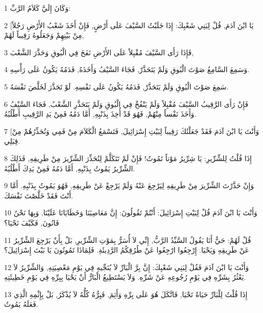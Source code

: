 \par 1 وَكَانَ إِلَيَّ كَلاَمُ الرَّبِّ:
\par 2 [يَا ابْنَ آدَمَ, قُلْ لِبَنِي شَعْبِكَ: إِذَا جَلَبْتُ السَّيْفَ عَلَى أَرْضٍ, فَإِنْ أَخَذَ شَعْبُ الأَرْضِ رَجُلاً مِنْ بَيْنِهِمْ وَجَعَلُوهُ رَقِيباً لَهُمْ,
\par 3 فَإِذَا رَأَى السَّيْفَ مُقْبِلاً عَلَى الأَرْضِ نَفَخَ فِي الْبُوقِ وَحَذَّرَ الشَّعْبَ,
\par 4 وَسَمِعَ السَّامِعُ صَوْتَ الْبُوقِ وَلَمْ يَتَحَذَّرْ, فَجَاءَ السَّيْفُ وَأَخَذَهُ, فَدَمُهُ يَكُونُ عَلَى رَأْسِهِ.
\par 5 سَمِعَ صَوْتَ الْبُوقِ وَلَمْ يَتَحَذَّرْ, فَدَمُهُ يَكُونُ عَلَى نَفْسِهِ. لَوْ تَحَذَّرَ لَخَلَّصَ نَفْسَهُ.
\par 6 فَإِنْ رَأَى الرَّقِيبُ السَّيْفَ مُقْبِلاً وَلَمْ يَنْفُخْ فِي الْبُوقِ وَلَمْ يَتَحَذَّرِ الشَّعْبُ, فَجَاءَ السَّيْفُ وَأَخَذَ نَفْساً مِنْهُمْ, فَهُوَ قَدْ أُخِذَ بِذَنْبِهِ, أَمَّا دَمُهُ فَمِنْ يَدِ الرَّقِيبِ أَطْلُبُهُ.
\par 7 [وَأَنْتَ يَا ابْنَ آدَمَ فَقَدْ جَعَلْتُكَ رَقِيباً لِبَيْتِ إِسْرَائِيلَ, فَتَسْمَعُ الْكَلاَمَ مِنْ فَمِي وَتُحَذِّرُهُمْ مِنْ قِبَلِي.
\par 8 إِذَا قُلْتُ لِلشِّرِّيرِ: يَا شِرِّيرُ مَوْتاً تَمُوتُ! فَإِنْ لَمْ تَتَكَلَّمْ لِتُحَذِّرَ الشِّرِّيرَ مِنْ طَرِيقِهِ, فَذَلِكَ الشِّرِّيرُ يَمُوتُ بِذَنْبِهِ, أَمَّا دَمُهُ فَمِنْ يَدِكَ أَطْلُبُهُ.
\par 9 وَإِنْ حَذَّرْتَ الشِّرِّيرَ مِنْ طَرِيقِهِ لِيَرْجِعَ عَنْهُ وَلَمْ يَرْجِعْ عَنْ طَرِيقِهِ, فَهُوَ يَمُوتُ بِذَنْبِهِ. أَمَّا أَنْتَ فَقَدْ خَلَّصْتَ نَفْسَكَ.
\par 10 وَأَنْتَ يَا ابْنَ آدَمَ قُلْ لِبَيْتِ إِسْرَائِيلَ: أَنْتُمْ تَقُولُونَ: إِنَّ مَعَاصِيَنَا وَخَطَايَانَا عَلَيْنَا, وَبِهَا نَحْنُ فَانُونَ, فَكَيْفَ نَحْيَا؟
\par 11 قُلْ لَهُمْ: حَيٌّ أَنَا يَقُولُ السَّيِّدُ الرَّبُّ, إِنِّي لاَ أُسَرُّ بِمَوْتِ الشِّرِّيرِ, بَلْ بِأَنْ يَرْجِعَ الشِّرِّيرُ عَنْ طَرِيقِهِ وَيَحْيَا. إِرْجِعُوا ارْجِعُوا عَنْ طُرُقِكُمُ الرَّدِيئَةِ. فَلِمَاذَا تَمُوتُونَ يَا بَيْتَ إِسْرَائِيلَ؟
\par 12 وَأَنْتَ يَا ابْنَ آدَمَ فَقُلْ لِبَنِي شَعْبِكَ: إِنَّ بِرَّ الْبَارِّ لاَ يُنَجِّيهِ فِي يَوْمِ مَعْصِيَتِهِ, وَالشِّرِّيرُ لاَ يَعْثُرُ بِشَرِّهِ فِي يَوْمِ رُجُوعِهِ عَنْ شَرِّهِ. وَلاَ يَسْتَطِيعُ الْبَارُّ أَنْ يَحْيَا بِبِرِّهِ فِي يَوْمِ خَطِيئَتِهِ.
\par 13 إِذَا قُلْتُ لِلْبَارِّ حَيَاةً تَحْيَا, فَاتَّكَلَ هُوَ عَلَى بِرِّهِ وَأَثِمَ, فَبِرُّهُ كُلُّهُ لاَ يُذْكَرُ, بَلْ بِإِثْمِهِ الَّذِي فَعَلَهُ يَمُوتُ.
